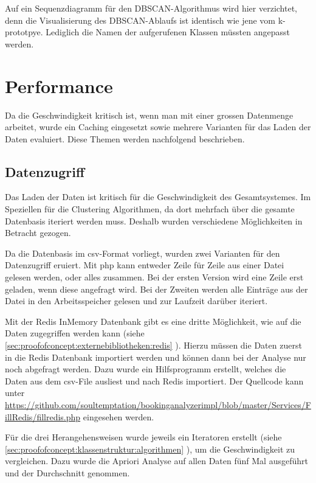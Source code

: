 Auf ein Sequenzdiagramm für den DBSCAN-Algorithmus wird hier verzichtet, denn die Visualisierung des DBSCAN-Ablaufs ist identisch wie jene vom k-prototpye. Lediglich die Namen der aufgerufenen Klassen müssten angepasst werden.


\section{Performance}
\label{sec:proofofconcept:performance}
Da die Geschwindigkeit kritisch ist, wenn man mit einer grossen Datenmenge arbeitet, wurde ein Caching eingesetzt sowie mehrere Varianten für das Laden der Daten evaluiert. Diese Themen werden nachfolgend beschrieben.

\subsection{Datenzugriff}
\label{sec:proofofconcept:performance:datenzugriff}
Das Laden der Daten ist kritisch für die Geschwindigkeit des Gesamtsystemes. Im Speziellen für die Clustering Algorithmen, da dort mehrfach über die gesamte Datenbasis iteriert werden muss. Deshalb wurden verschiedene Möglichkeiten in Betracht gezogen.

Da die Datenbasis im \gls{csv}-Format vorliegt, wurden zwei Varianten für den Datenzugriff eruiert. Mit \gls{php} kann entweder Zeile für Zeile aus einer Datei gelesen werden, oder alles zusammen.  Bei der ersten Version wird eine Zeile erst geladen, wenn diese angefragt wird. Bei der Zweiten werden alle Einträge aus der Datei in den Arbeitsspeicher gelesen und zur Laufzeit darüber iteriert.

Mit der Redis InMemory Datenbank gibt es eine dritte Möglichkeit, wie auf die Daten zugegriffen werden kann (siehe \cref{sec:proofofconcept:externebibliotheken:redis} ). Hierzu müssen die Daten zuerst in die Redis Datenbank importiert werden und können dann bei der Analyse nur noch abgefragt werden. Dazu wurde ein Hilfsprogramm erstellt, welches die Daten aus dem \gls{csv}-File ausliest und nach Redis importiert. Der Quellcode kann unter \url{https://github.com/soultemptation/bookinganalyzerimpl/blob/master/Services/FillRedis/fillredis.php} eingesehen werden.

Für die drei Herangehensweisen wurde jeweils ein Iteratoren erstellt (siehe \cref{sec:proofofconcept:klassenstruktur:algorithmen} ), um die Geschwindigkeit zu vergleichen. Dazu wurde die Apriori Analyse auf allen Daten fünf Mal ausgeführt und der Durchschnitt genommen.

